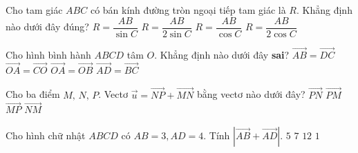 \begin{ex}
\begin{ex}
	Cho tam giác $ABC$ có bán kính đường tròn ngoại tiếp tam giác là $R$. Khẳng định nào dưới đây đúng?
	\choice
	{ $R=\dfrac{AB}{\sin C}$}
	{\True $R=\dfrac{AB}{2\sin C}$}
	{ $R=\dfrac{AB}{\cos C}$}
	{ $R=\dfrac{AB}{2\cos C}$}
\end{ex}

\begin{ex}%
	
	Cho hình bình hành $ABCD$ tâm $O$. Khẳng định nào dưới đây \textbf{sai}?
	\choice
	{ $\overrightarrow{AB}=\overrightarrow{DC}$}
	{ $\overrightarrow{OA}=\overrightarrow{CO}$}
	{\True $\overrightarrow{OA}=\overrightarrow{OB}$}
	{ $\overrightarrow{AD}=\overrightarrow{BC}$}
\end{ex}

\begin{ex}%
	
	Cho ba điểm $M,\,N,\,P$. Vectơ $\overrightarrow{u}=\overrightarrow{NP}+\overrightarrow{MN}$ bằng vectơ nào dưới đây?
	\choice
	{ $\overrightarrow{PN}$}
	{ $\overrightarrow{PM}$}
	{\True $\overrightarrow{MP}$}
	{ $\overrightarrow{NM}$}
\end{ex}

\begin{ex}%
	
	Cho hình chữ nhật $ABCD$ có $AB=3,AD=4$. Tính $\left| \overrightarrow{AB}+\overrightarrow{AD} \right|$.
	\choice
	{\True $5$}
	{ $7$}
	{ $12$}
	{ $1$}
\end{ex}

\begin{ex}%
	

\end{ex}
\end{ex}
